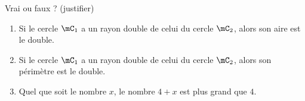 
\begin{exercice}\label{exo2smath-0313}

    Vrai ou faux ? (justifier)
    \begin{enumerate}
        \item
            Si le cercle \( \mC_1\) a un rayon double de celui du cercle \( \mC_2\), alors son aire est le double.
        \item
            Si le cercle \( \mC_1\) a un rayon double de celui du cercle \( \mC_2\), alors son périmètre est le double.
        \item
            Quel que soit le nombre \( x\), le nombre \( 4+x\) est plus grand que \( 4\).
    \end{enumerate}

\end{exercice}
